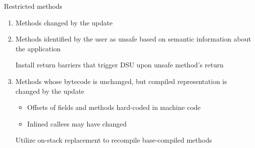 \begin{frame}[t,fragile]{Restricted methods}%
\begin{enumerate}[(1)]
\item Methods changed by the update
\item Methods identified by the user as unsafe based on semantic
information about the application
\begin{block}{}
Install return barriers that trigger DSU upon unsafe method's return
\end{block}
\vspace{2ex}
\item<2> Methods whose bytecode is unchanged, but compiled representation is
      changed by the update
  \begin{itemize}
  \item Offsets of fields and methods hard-coded in machine code
  \item Inlined callees may have changed
  \end{itemize}
\begin{block}{}
Utilize on-stack replacement to recompile base-compiled methods
\end{block}
\end{enumerate}
\end{frame}

% 
% 


